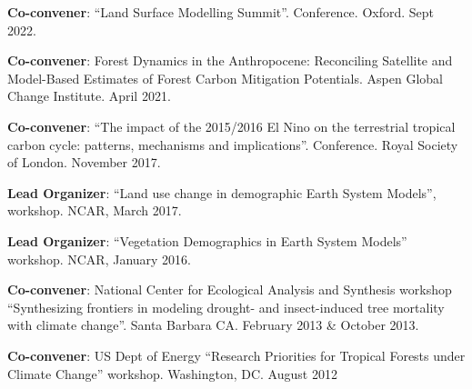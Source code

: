 \documentclass[10pt]{article}
\newenvironment{lonelist}[1][\enskip\textbullet]%
        {\vspace{-\baselineskip}\begin{list}{#1}{%
        \setlength{\itemindent}{-3pt} 
        \setlength{\partopsep}{0pt}%
        \setlength{\leftmargin}{10pt}
        \setlength{\topsep}{15pt}}}
        {\end{list}\vspace{-.3\baselineskip}}
\begin{document}
\begin{lonelist}
\begin{lonelist}
\item \textbf{Co-convener}: ``Land Surface Modelling Summit''. Conference. Oxford. Sept 2022.
\item \textbf{Co-convener}: Forest Dynamics in the Anthropocene: Reconciling Satellite and Model-Based Estimates of Forest Carbon Mitigation Potentials.  Aspen Global Change Institute. April 2021. 
\item  \textbf{Co-convener}: ``The impact of the 2015/2016 El Nino on the terrestrial tropical carbon cycle: patterns, mechanisms and implications''. Conference.  Royal Society of London. November 2017. 
\item \textbf{Lead Organizer}: ``Land use change in demographic  Earth System Models'', workshop. NCAR, March 2017.
\item \textbf{Lead Organizer}: ``Vegetation Demographics in Earth System Models'' workshop. NCAR, January 2016.
\item \textbf{Co-convener}: National Center for Ecological Analysis and Synthesis workshop ``Synthesizing frontiers in modeling drought- and insect-induced tree mortality with climate change''.  Santa Barbara CA. February 2013 \& October 2013. 
\item \textbf{Co-convener}: US Dept of Energy ``Research Priorities for Tropical Forests under Climate Change'' workshop. Washington, DC. August 2012 
\end{lonelist}


\end{lonelist}
\end{document}
